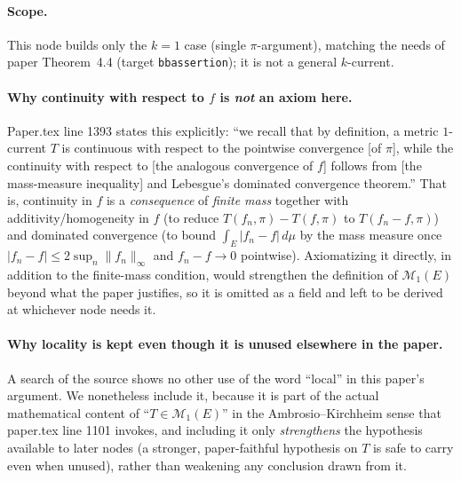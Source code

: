 \begin{definition}
  \paragraph{Scope.} This node builds only the $k=1$ case (single $\pi$-argument), matching the
  needs of paper Theorem~4.4 (target \texttt{bbassertion}); it is not a general $k$-current.

  \paragraph{Why continuity with respect to $f$ is \emph{not} an axiom here.} Paper.tex line 1393
  states this explicitly: ``we recall that by definition, a metric $1$-current $T$ is continuous
  with respect to the pointwise convergence [of $\pi$], while the continuity with respect to [the
  analogous convergence of $f$] follows from [the mass-measure inequality] and Lebesgue's
  dominated convergence theorem.'' That is, continuity in $f$ is a \emph{consequence} of
  \emph{finite mass} together with additivity/homogeneity in $f$ (to reduce $T(f_n,\pi)-T(f,\pi)$
  to $T(f_n-f,\pi)$) and dominated convergence (to bound $\int_E |f_n-f|\,d\mu$ by the mass measure
  once $|f_n-f|\le 2\sup_n\|f_n\|_\infty$ and $f_n-f\to 0$ pointwise). Axiomatizing it directly, in
  addition to the finite-mass condition, would strengthen the definition of $\mathcal{M}_1(E)$
  beyond what the paper justifies, so it is omitted as a field and left to be derived at whichever
  node needs it.

  \paragraph{Why locality is kept even though it is unused elsewhere in the paper.} A search of the
  source shows no other use of the word ``local'' in this paper's argument. We nonetheless include
  it, because it is part of the actual mathematical content of ``$T \in \mathcal{M}_1(E)$'' in the
  Ambrosio--Kirchheim sense that paper.tex line 1101 invokes, and including it only
  \emph{strengthens} the hypothesis available to later nodes (a stronger, paper-faithful
  hypothesis on $T$ is safe to carry even when unused), rather than weakening any conclusion drawn
  from it.


\end{definition}
